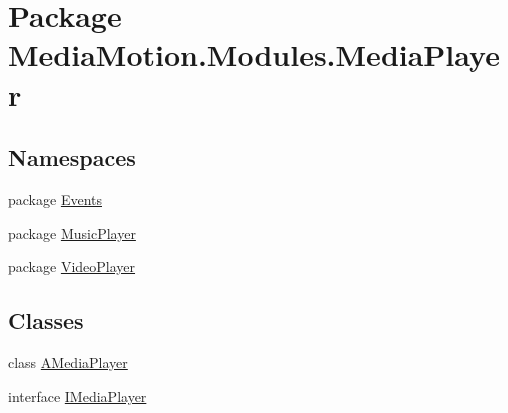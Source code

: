 \hypertarget{namespace_media_motion_1_1_modules_1_1_media_player}{\section{Package Media\+Motion.\+Modules.\+Media\+Player}
\label{namespace_media_motion_1_1_modules_1_1_media_player}
}
\subsection*{Namespaces}
\begin{DoxyCompactItemize}
\item 
package \hyperlink{namespace_media_motion_1_1_modules_1_1_media_player_1_1_events}{Events}
\item 
package \hyperlink{namespace_media_motion_1_1_modules_1_1_media_player_1_1_music_player}{Music\+Player}
\item 
package \hyperlink{namespace_media_motion_1_1_modules_1_1_media_player_1_1_video_player}{Video\+Player}
\end{DoxyCompactItemize}
\subsection*{Classes}
\begin{DoxyCompactItemize}
\item 
class \hyperlink{class_media_motion_1_1_modules_1_1_media_player_1_1_a_media_player}{A\+Media\+Player}
\item 
interface \hyperlink{interface_media_motion_1_1_modules_1_1_media_player_1_1_i_media_player}{I\+Media\+Player}
\end{DoxyCompactItemize}
